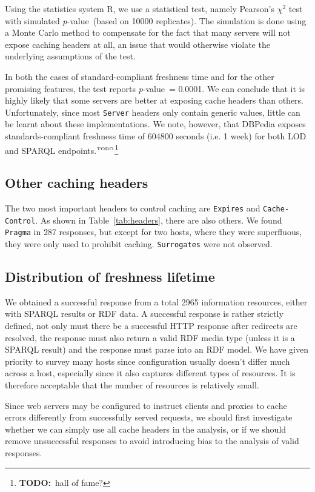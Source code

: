 \documentclass{llncs}
\newcommand{\pvalue}{\textit{p}-value\ }
\newcommand{\httph}[1]{\texttt{#1}}
\newcommand{\todo}[1]{\ensuremath{^{\textrm{\tiny{TODO}\normalsize}}}\footnote{\textbf{TODO:}~#1}}
\begin{document}
Using the statistics system R\cite{kn:r}, we use a statistical test,
namely Pearson's $\chi^2$ test with simulated \pvalue (based on 10000
replicates). The simulation is done using a Monte Carlo method to
compensate for the fact that many servers will not expose caching
headers at all, an issue that would otherwise violate the underlying
assumptions of the test.

In both the cases of standard-compliant freshness time and for the
other promising features, the test reports \pvalue = 0.0001. We can
conclude that it is highly likely that some servers are better at
exposing cache headers than others. Unfortunately, since most
\httph{Server} headers only contain generic values, little can be
learnt about these implementations. We note, however, that DBPedia
exposes standards-compliant freshness time of 604800 seconds (i.e. 1
week) for both LOD and SPARQL endpoints.\todo{hall of fame?}

\subsection{Other caching headers}

The two most important headers to control caching are \httph{Expires}
and \httph{Cache-Control}. As shown in Table~\ref{tab:headers}, there
are also others. We found \httph{Pragma} in 287 responses, but except
for two hosts, where they were superfluous, they were only used to
prohibit caching. \httph{Surrogates} were not observed.

\subsection{Distribution of freshness lifetime}

We obtained a successful response from a total 2965 information
resources, either with SPARQL results or RDF data. A successful
response is rather strictly defined, not only must there be a
successful HTTP response after redirects are resolved, the response
must also return a valid RDF media type (unless it is a SPARQL result)
and the response must parse into an RDF model. We have given priority
to survey many hosts since configuration usually doesn't differ much
across a host, especially since it also captures different types of
resources. It is therefore acceptable that the number of resources is
relatively small.

Since web servers may be configured to instruct clients and proxies to
cache errors differently from successfully served requests, we should
first investigate whether we can simply use all cache headers in the
analysis, or if we should remove unsuccessful responses to avoid
introducing bias to the analysis of valid responses.
\end{document}
